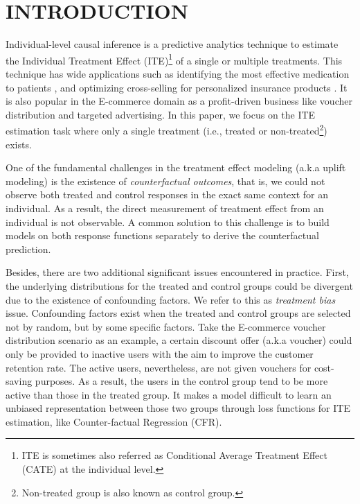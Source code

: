 \documentclass[sigconf]{acmart}
\begin{document}

\maketitle

\section{INTRODUCTION}
Individual-level causal inference is a predictive analytics technique to estimate the Individual Treatment Effect (ITE)\footnote{ITE is sometimes also referred as Conditional Average Treatment Effect (CATE) at the individual level.} of a single or multiple treatments. This technique has wide applications such as identifying the most effective medication to patients \cite{Jaskowski2012}, and optimizing cross-selling for personalized insurance products \cite{Guelman2015a}. It is also popular in the E-commerce domain as a profit-driven business like voucher distribution and targeted advertising. In this paper, we focus on the ITE estimation task where only a single treatment (i.e., treated or non-treated\footnote{Non-treated group is also known as control group.}) exists.

One of the fundamental challenges in the treatment effect modeling (a.k.a uplift modeling) is the existence of \textit{counterfactual outcomes}, that is, we could not observe both treated and control responses in the exact same context for an individual. As a result, the direct measurement of treatment effect from an individual is not observable. A common solution to this challenge is to build models on both response functions separately to derive the counterfactual prediction.

Besides, there are two additional significant issues encountered in practice. First, the underlying distributions for the treated and control groups could be divergent due to the existence of confounding factors. We refer to this as \textit{treatment bias} issue. Confounding factors exist when the treated and control groups are selected not by random, but by some specific factors. Take the E-commerce voucher distribution scenario as an example, a certain discount offer (a.k.a voucher) could only be provided to inactive users with the aim to improve the customer retention rate. The active users, nevertheless, are not given vouchers for cost-saving purposes. As a result, the users in the control group tend to be more active than those in the treated group. It makes a model difficult to learn an unbiased representation between those two groups through loss functions for ITE estimation, like Counter-factual Regression (CFR)\cite{Shalit2017}. 
\end{document}
